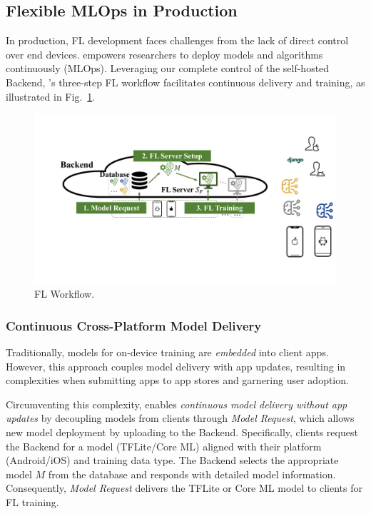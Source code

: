 \documentclass[conference]{IEEEtran}
\begin{document}
\subsection{Flexible MLOps in Production}
\label{sec:mlops}
\newcommand{\model}{$M$}
\newcommand{\fs}{$S_\mathrm F$}
In production,
FL development faces challenges from
the lack of direct control over end devices.
\FedKit{} empowers researchers to deploy models and algorithms continuously (MLOps).
Leveraging our complete control of the self-hosted Backend,
\FedKit{}'s three-step FL workflow
facilitates continuous delivery and training,
as illustrated in Fig.~\ref{fig:fl-workflow}.

\begin{figure}
    \centering
    \includegraphics*[width=0.8\linewidth]{fl_workflow.pdf}
    \caption{\FedKit{} FL Workflow.}
    \label{fig:fl-workflow}
\end{figure}

\subsubsection{Continuous Cross-Platform Model Delivery}
Traditionally, models for on-device training are \textit{embedded} into client apps.
However, this approach couples model delivery with app updates,
resulting in complexities when submitting apps to app stores and garnering user adoption.

Circumventing this complexity,
\FedKit{} enables \textit{continuous model delivery without app updates} by
decoupling models from clients through \textit{Model Request},
which allows new model deployment by uploading to the Backend.
Specifically, clients request the Backend for a model (TFLite/Core ML)
aligned with
their platform (Android/iOS) and training data type.
The Backend selects the appropriate model \model{} from the database and
responds with detailed model information.
Consequently, \textit{Model Request} delivers the TFLite or Core ML model
to clients for FL training.
\end{document}
